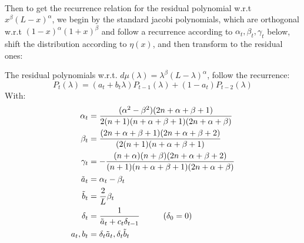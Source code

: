 \documentclass{article}
\begin{document}
\paragraph{}
\label{jacobi recurrence}
Then to get  the recurrence relation for the residual polynomial w.r.t $x^\beta(L-x)^\alpha$, we begin by the standard jacobi polynomials, which are orthogonal w.r.t $(1-x)^\alpha(1+x)^\beta$ and follow a recurrence according to $\alpha_t,\beta_t,\gamma_t$ below, shift the distribution according to $\eta(x)$, and then transform to the residual ones:
\begin{prop}
The residual polynomials w.r.t. $d\mu(\lambda)=\lambda^\beta(L-\lambda)^\alpha$, follow the recurrence:
\begin{equation*}
    P_t(\lambda)=(a_t+b_t\lambda)P_{t-1}(\lambda)+(1-a_t)P_{t-2}(\lambda)
\end{equation*}
With:
\begin{align}
    \alpha_t&=\frac{(\alpha^2-\beta^2)(2n+\alpha+\beta+1)}{
            2(n+1)(n+\alpha+\beta+1)(2n+\alpha+\beta)} \\
        \beta_t&=\frac{(2n+\alpha+\beta+1)(2n+\alpha+\beta+2)}{
            (2(n+1)(n+\alpha+\beta+1)} \\
        \gamma_t&=-\frac{(n+\alpha)(n+\beta)(2n+\alpha+\beta+2)}{
            (n+1)(n+\alpha+\beta+1)(2n+\alpha+\beta)} \\
        \tilde{a}_t&=\alpha_t-\beta_t \\
        \tilde{b}_t&=\frac{2}{L}\beta_t \\
        \delta_t&=\frac{1}{\tilde{a}_t+c_t\delta_{t-1}}  \hspace{1 cm} (\delta_0=0)\\
        a_t,b_t&=\delta_t\tilde{a}_t,\delta_t\tilde{b}_t
\end{align}


\end{prop}
\end{document}
